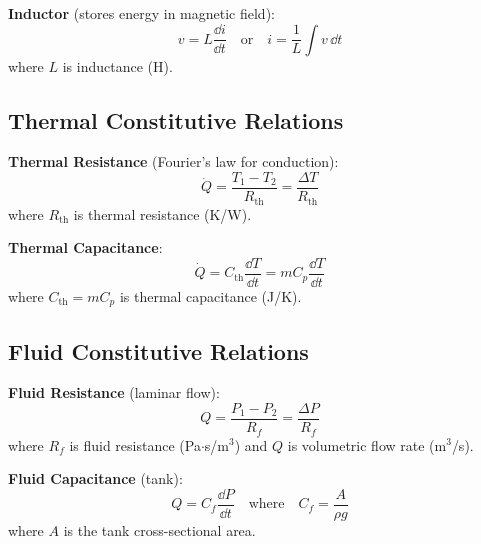 \textbf{Inductor} (stores energy in magnetic field):
\begin{equation}
v = L\frac{\dd i}{\dd t} \quad \text{or} \quad i = \frac{1}{L}\int v \, \dd t
\label{eq:inductor_const}
\end{equation}
where $L$ is inductance (H).

\subsection{Thermal Constitutive Relations}

\textbf{Thermal Resistance} (Fourier's law for conduction):
\begin{equation}
\dot{Q} = \frac{T_1 - T_2}{R_{\text{th}}} = \frac{\Delta T}{R_{\text{th}}}
\label{eq:thermal_resistance}
\end{equation}
where $R_{\text{th}}$ is thermal resistance (K/W).

\textbf{Thermal Capacitance}:
\begin{equation}
\dot{Q} = C_{\text{th}}\frac{\dd T}{\dd t} = mC_p\frac{\dd T}{\dd t}
\label{eq:thermal_capacitance}
\end{equation}
where $C_{\text{th}} = mC_p$ is thermal capacitance (J/K).

\subsection{Fluid Constitutive Relations}

\textbf{Fluid Resistance} (laminar flow):
\begin{equation}
Q = \frac{P_1 - P_2}{R_f} = \frac{\Delta P}{R_f}
\label{eq:fluid_resistance}
\end{equation}
where $R_f$ is fluid resistance (Pa$\cdot$s/m$^3$) and $Q$ is volumetric flow rate (m$^3$/s).

\textbf{Fluid Capacitance} (tank):
\begin{equation}
Q = C_f\frac{\dd P}{\dd t} \quad \text{where} \quad C_f = \frac{A}{\rho g}
\label{eq:fluid_capacitance}
\end{equation}
where $A$ is the tank cross-sectional area.

